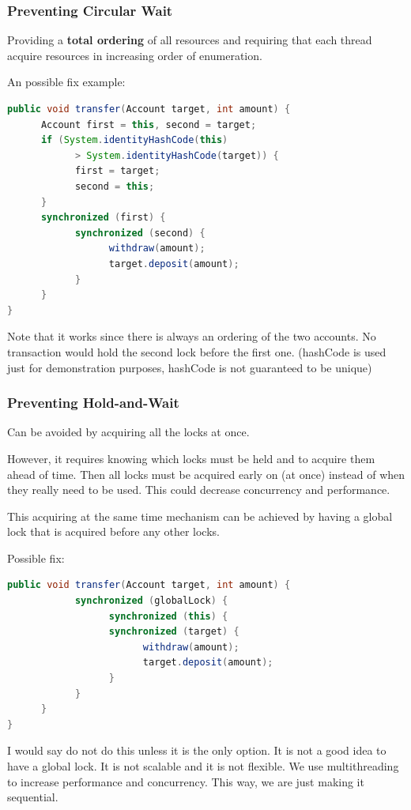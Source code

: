 \documentclass[letterpaper,12pt]{article}
\begin{document}
\subsubsection{Preventing Circular Wait}
Providing a \textbf{total ordering} of all resources and requiring that each thread acquire resources in increasing order of enumeration. 

An possible fix example:\begin{lstlisting}[language=Java]
public void transfer(Account target, int amount) {
      Account first = this, second = target;
      if (System.identityHashCode(this) 
            > System.identityHashCode(target)) {
            first = target;
            second = this;
      }
      synchronized (first) {
            synchronized (second) {
                  withdraw(amount);
                  target.deposit(amount);
            }
      }
}      
\end{lstlisting}
Note that it works since there is always an ordering of the two accounts. No transaction would hold the second lock before the first one. (hashCode is used just for demonstration purposes, hashCode is not guaranteed to be unique)
\subsubsection{Preventing Hold-and-Wait}
Can be avoided by acquiring all the locks at once. 

However, it requires knowing which locks must be held and to acquire them ahead of time. Then all locks must be acquired early on (at once) instead of when they really need to be used. This could decrease concurrency and performance.

This acquiring at the same time mechanism can be achieved by having a global lock that is acquired before any other locks.

Possible fix:\begin{lstlisting}[language=Java]
public void transfer(Account target, int amount) {
            synchronized (globalLock) {
                  synchronized (this) {
                  synchronized (target) {
                        withdraw(amount);
                        target.deposit(amount);
                  }
            }
      }
}
\end{lstlisting}
I would say do not do this unless it is the only option. It is not a good idea to have a global lock. It is not scalable and it is not flexible. We use multithreading to increase performance and concurrency. This way, we are just making it sequential.
\end{document}
